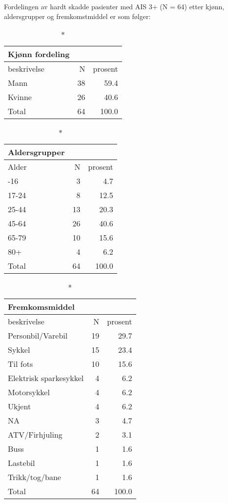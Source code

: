 \documentclass[
  letterpaper,
  DIV=11,
  numbers=noendperiod]{scrartcl}
\begin{document}
Fordelingen av hardt skadde pasienter med AIS 3+ (N = 64) etter kjønn,
aldersgrupper og fremkomstmiddel er som følger:

\begingroup
\fontsize{12.0pt}{14.4pt}\selectfont
\begin{longtable*}{lrr}
\caption*{
{\large Kjønn fordeling}
} \\ 
\toprule
beskrivelse & N & prosent \\ 
\midrule\addlinespace[2.5pt]
Mann & 38 & 59.4 \\ 
Kvinne & 26 & 40.6 \\ 
Total & 64 & 100.0 \\ 
\bottomrule
\end{longtable*}
\endgroup

\begingroup
\fontsize{12.0pt}{14.4pt}\selectfont
\begin{longtable*}{lrr}
\caption*{
{\large Aldersgrupper}
} \\ 
\toprule
Alder & N & prosent \\ 
\midrule{}-16 & 3 & 4.7 \\ 
17-24 & 8 & 12.5 \\ 
25-44 & 13 & 20.3 \\ 
45-64 & 26 & 40.6 \\ 
65-79 & 10 & 15.6 \\ 
80+ & 4 & 6.2 \\ 
Total & 64 & 100.0 \\ 
\bottomrule
\end{longtable*}
\endgroup

\begingroup
\fontsize{12.0pt}{14.4pt}\selectfont
\begin{longtable*}{lrr}
\caption*{
{\large Fremkomsmiddel}
} \\ 
\toprule
beskrivelse & N & prosent \\ 
\midrule\addlinespace[2.5pt]
Personbil/Varebil & 19 & 29.7 \\ 
Sykkel & 15 & 23.4 \\ 
Til fots & 10 & 15.6 \\ 
Elektrisk sparkesykkel & 4 & 6.2 \\ 
Motorsykkel & 4 & 6.2 \\ 
Ukjent & 4 & 6.2 \\ 
NA & 3 & 4.7 \\ 
ATV/Firhjuling & 2 & 3.1 \\ 
Buss & 1 & 1.6 \\ 
Lastebil & 1 & 1.6 \\ 
Trikk/tog/bane & 1 & 1.6 \\ 
Total & 64 & 100.0 \\ 
\bottomrule
\end{longtable*}
\endgroup
\end{document}
